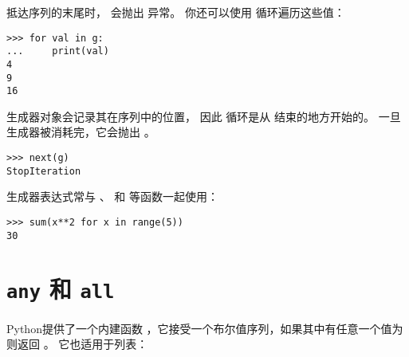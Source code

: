 
抵达序列的末尾时，  会抛出  异常。  
你还可以使用  循环遍历这些值：


\begin{lstlisting}
>>> for val in g:
...     print(val)
4
9
16
\end{lstlisting}


生成器对象会记录其在序列中的位置， 因此  循环是从  结束的地方开始的。  一旦生成器被消耗完，它会抛出  。

\begin{lstlisting}
>>> next(g)
StopIteration
\end{lstlisting}


生成器表达式常与  、  和  等函数一起使用：


\begin{lstlisting}
>>> sum(x**2 for x in range(5))
30
\end{lstlisting}

\section{{\tt any} 和 {\tt all}}


Python提供了一个内建函数 ，它接受一个布尔值序列，如果其中有任意一个值为  则返回 。  它也适用于列表：

